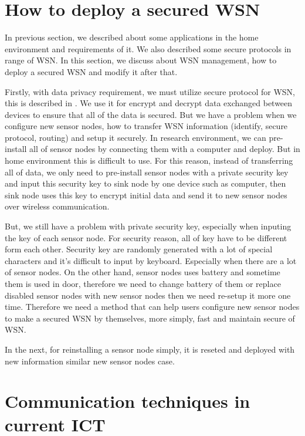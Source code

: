 \section{How to deploy a secured WSN}\label{sec:bg_howto}

In previous section, we described about some applications in the home environment and requirements of it. We also described some secure protocols in range of WSN. In this section, we discuss about WSN management, how to deploy a secured WSN and modify it after that.

Firstly, with data privacy requirement, we must utilize secure protocol for WSN, this is described in \cite{Simplicio:2010:SKM:1862461.1862545}\cite{BROSK} \cite{zigbee_secure}\cite{LBKMS}\cite{LKMS}\cite{Eschenauer:2002:KSD:586110.586117}\cite{ClusterKeyGrouping}\cite{blom}\cite{Du:2003:PKP:948109.948118}\cite{ios}. We use it for encrypt and decrypt data exchanged between devices to ensure that all of the data is secured. But we have a problem when we configure new sensor nodes, how to transfer WSN information (identify, secure protocol, routing) and setup it securely. In research environment, we can pre-install all of sensor nodes by connecting them with a computer and deploy. But in home environment this is difficult to use. For this reason, instead of transferring all of data, we only need to pre-install sensor nodes with a private security key and input this security key to sink node by one device such as computer, then sink node uses this key to encrypt initial data and send it to new sensor nodes over wireless communication.

But, we still have a problem with private security key, especially when inputing the key of each sensor node. For security reason, all of key have to be different form each other. Security key are randomly generated with a lot of special characters and it's difficult to input by keyboard. Especially when there are a lot of sensor nodes. On the other hand, sensor nodes uses battery and sometime them is used in door, therefore we need to change battery of them or replace disabled sensor nodes with new sensor nodes then we need re-setup it more one time. Therefore we need a method that can help users configure new sensor nodes to make a secured WSN by themselves, more simply, fast and maintain secure of WSN.

In the next, for reinstalling a sensor node simply, it is reseted and deployed with new information similar new sensor nodes case.

\section{Communication techniques in current ICT}\label{sec:bg_technique}

